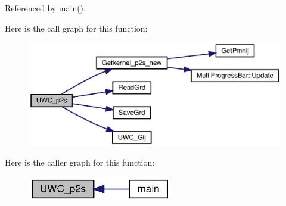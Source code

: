 Referenced by main().

Here is the call graph for this function\+:
\nopagebreak
\begin{figure}[H]
\begin{center}
\leavevmode
\includegraphics[width=350pt]{Conti2D_8cpp_af8adb87017663774bfd342b39facc828_af8adb87017663774bfd342b39facc828_cgraph}
\end{center}
\end{figure}
Here is the caller graph for this function\+:\nopagebreak
\begin{figure}[H]
\begin{center}
\leavevmode
\includegraphics[width=179pt]{Conti2D_8cpp_af8adb87017663774bfd342b39facc828_af8adb87017663774bfd342b39facc828_icgraph}
\end{center}
\end{figure}
